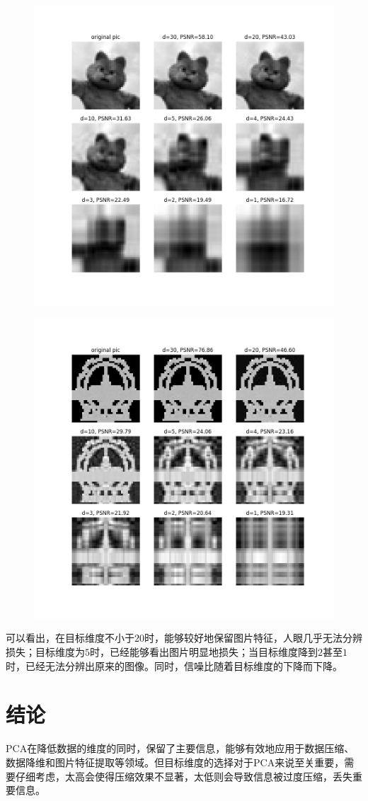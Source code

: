 \documentclass[lang=cn,11pt,a4paper,cite=authoryear]{elegantpaper}
\begin{document}
\begin{figure}[H]
	\centering
	\includegraphics[width=0.6\linewidth]{images/ml_lab4_4.png}
	\caption{}
	\label{fig:mllab44}
\end{figure}

\begin{figure}[H]
	\centering
	\includegraphics[width=0.6\linewidth]{images/ml_lab4_5.png}
	\caption{}
	\label{fig:mllab45}
\end{figure}

可以看出，在目标维度不小于$20$时，能够较好地保留图片特征，人眼几乎无法分辨损失；目标维度为$5$时，已经能够看出图片明显地损失；当目标维度降到$2$甚至$1$时，已经无法分辨出原来的图像。同时，信噪比随着目标维度的下降而下降。

\section{结论}

PCA在降低数据的维度的同时，保留了主要信息，能够有效地应用于数据压缩、数据降维和图片特征提取等领域。但目标维度的选择对于PCA来说至关重要，需要仔细考虑，太高会使得压缩效果不显著，太低则会导致信息被过度压缩，丢失重要信息。
\end{document}
